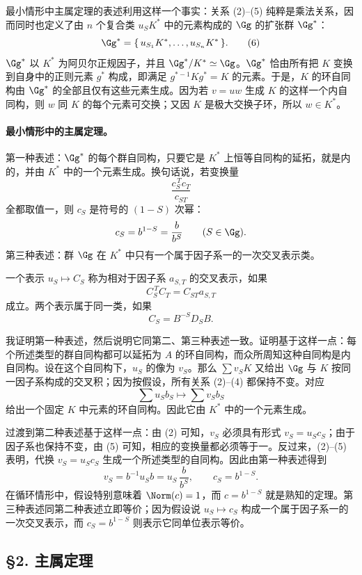 最小情形中主属定理的表述利用这样一个事实：关系 (2)--(5) 纯粹是乘法关系，因而同时也定义了由 \(n\) 个复合类 \(u_SK^*\) 中的元素构成的 \(\Gg\) 的扩张群 \(\Gg^*\)：
\[
        \Gg^*=\{\,u_{S_1}K^*,\ldots,u_{S_n}K^*\,\}.            \tag{6}
\]
\(\Gg^*\) 以 \(K^*\) 为阿贝尔正规因子，并且 \(\Gg^*/K^*\simeq\Gg\)。\(\Gg^*\) 恰由所有把 \(K\) 变换到自身中的正则元素 \(g^*\) 构成，即满足 \(g^{*-1}Kg^*=K\) 的元素。于是，\(K\) 的环自同构由 \(\Gg^*\) 的全部且仅有这些元素生成。因为若 \(v=uw\) 生成 \(K\) 的这样一个内自同构，则 \(w\) 同 \(K\) 的每个元素可交换；又因 \(K\) 是极大交换子环，所以 \(w\in K^*\)。

\paragraph{最小情形中的主属定理。}
第一种表述：\(\Gg^*\) 的每个群自同构，只要它是 \(K^*\) 上恒等自同构的延拓，就是内的，并由 \(K^*\) 中的一个元素生成。换句话说，若变换量
\[
        \frac{c_S^{\,T}c_T}{c_{ST}}
\]
全都取值一，则 \(c_S\) 是符号的 \((1-S)\) 次幂：
\[
        c_S=b^{1-S}=\frac{b}{b^S}\qquad(S\in\Gg).
\]
第三种表述：群 \(\Gg\) 在 \(K^*\) 中只有一个属于因子系一的一次交叉表示类。

一个表示 \(u_S\mapsto C_S\) 称为相对于因子系 \(a_{S,T}\) 的交叉表示，如果
\[
        C_S^{\,T}C_T=C_{ST}a_{S,T}
\]
成立。两个表示属于同一类，如果
\[
        C_S=B^{-S}D_SB .
\]

我证明第一种表述，然后说明它同第二、第三种表述一致。证明基于这样一点：每个所述类型的群自同构都可以延拓为 \(A\) 的环自同构，而众所周知这种自同构是内自同构。设在这个自同构下，\(u_S\) 的像为 \(v_S\)。那么 \(\sum v_SK\) 又给出 \(\Gg\) 与 \(K\) 按同一因子系构成的交叉积；因为按假设，所有关系 (2)--(4) 都保持不变。对应
\[
        \sum u_Sb_S\longmapsto \sum v_Sb_S
\]
给出一个固定 \(K\) 中元素的环自同构。因此它由 \(K^*\) 中的一个元素生成。

过渡到第二种表述基于这样一点：由 (2) 可知，\(v_S\) 必须具有形式 \(v_S=u_Sc_S\)；由于因子系也保持不变，由 (5) 可知，相应的变换量都必须等于一。反过来，(2)--(5) 表明，代换 \(v_S=u_Sc_S\) 生成一个所述类型的自同构。因此由第一种表述得到
\[
        v_S=b^{-1}u_Sb=u_S\,\frac{b}{b^S},
        \qquad c_S=b^{1-S}.
\]
在循环情形中，假设特别意味着 \(\Norm(c)=1\)，而 \(c=b^{1-S}\) 就是熟知的定理。第三种表述同第二种表述立即等价；因为假设说 \(u_S\mapsto c_S\) 构成一个属于因子系一的一次交叉表示，而 \(c_S=b^{1-S}\) 则表示它同单位表示等价。

\subsection*{§2. 主属定理}

